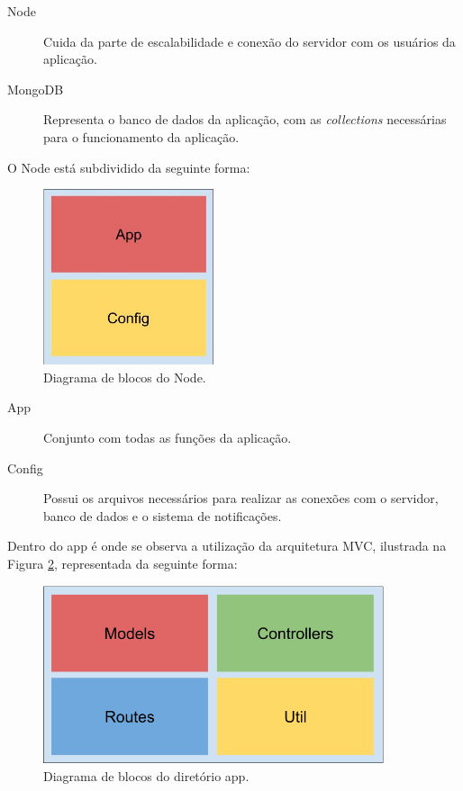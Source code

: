 \documentclass[
	12pt,				%
	oneside,			%
	a4paper,			%
	brazil				%
]{abntex2}
\begin{document}
\begin{description}
\item[Node] Cuida da parte de escalabilidade e conexão do servidor com os usuários da aplicação.
\item[MongoDB] Representa o banco de dados da aplicação, com as \textit{collections} necessárias para o funcionamento da aplicação.
\end{description}

O Node está subdividido da seguinte forma:

\begin{figure}[H]
\centering
\includegraphics[width=5cm, center]{images/brick_diagram_node}
\caption{Diagrama de blocos do Node.}
\label{Rotulo}
\end{figure}

\begin{description}
\item[App] Conjunto com todas as funções da aplicação.
\item[Config] Possui os arquivos necessários para realizar as conexões com o servidor, banco de dados e o sistema de notificações.
\end{description}

Dentro do app é onde se observa a utilização da arquitetura MVC, ilustrada na Figura \ref{nodeapp}, representada da seguinte forma:

\begin{figure}[H]
\centering
\includegraphics[width=10cm, center]{images/brick_diagram_node_app}
\caption{Diagrama de blocos do diretório app.}
\label{nodeapp}
\end{figure}
\end{document}
